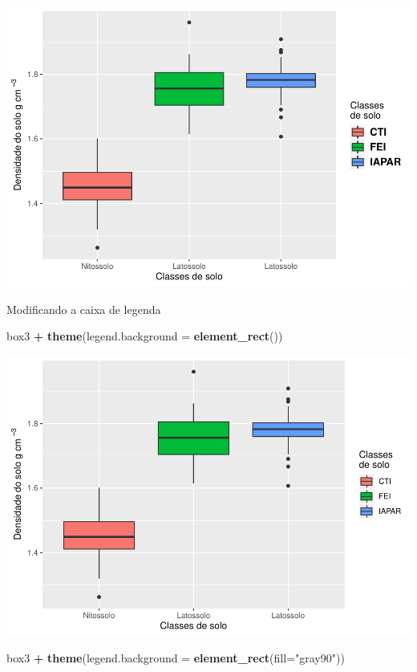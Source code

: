 \documentclass[]{book}
\newenvironment{Shaded}{\begin{snugshade}}{\end{snugshade}}
\newcommand{\DataTypeTok}[1]{\textcolor[rgb]{0.13,0.29,0.53}{#1}}
\newcommand{\KeywordTok}[1]{\textcolor[rgb]{0.13,0.29,0.53}{\textbf{#1}}}
\newcommand{\NormalTok}[1]{#1}
\newcommand{\OperatorTok}[1]{\textcolor[rgb]{0.81,0.36,0.00}{\textbf{#1}}}
\newcommand{\StringTok}[1]{\textcolor[rgb]{0.31,0.60,0.02}{#1}}
\begin{document}
\includegraphics{TudodoR_files/figure-latex/unnamed-chunk-213-2.pdf}

Modificando a caixa de legenda

\begin{Shaded}
\begin{Highlighting}[]
\NormalTok{box3 }\OperatorTok{+}\StringTok{ }\KeywordTok{theme}\NormalTok{(}\DataTypeTok{legend.background =} \KeywordTok{element_rect}\NormalTok{())}
\end{Highlighting}
\end{Shaded}

\includegraphics{TudodoR_files/figure-latex/unnamed-chunk-214-1.pdf}

\begin{Shaded}
\begin{Highlighting}[]
\NormalTok{box3 }\OperatorTok{+}\StringTok{ }\KeywordTok{theme}\NormalTok{(}\DataTypeTok{legend.background =} \KeywordTok{element_rect}\NormalTok{(}\DataTypeTok{fill=}\StringTok{"gray90"}\NormalTok{))}
\end{Highlighting}
\end{Shaded}
\end{document}
